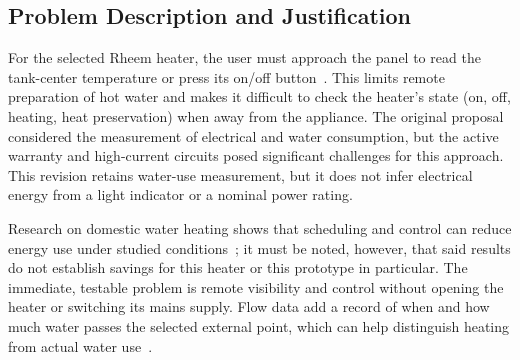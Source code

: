 \subsection{Problem Description and Justification}

For the selected Rheem heater, the user must approach the panel to read the tank-center temperature or press its on/off button~\cite{rheemmanual}. This limits remote preparation of hot water and makes it difficult to check the heater's state (on, off, heating, heat preservation) when away from the appliance. The original proposal considered the measurement of electrical and water consumption, but the active warranty and high-current circuits posed significant challenges for this approach. This revision retains water-use measurement, but it does not infer electrical energy from a light indicator or a nominal power rating.

Research on domestic water heating shows that scheduling and control can reduce energy use under studied conditions~\cite{booysen2019}; it must be noted, however, that said results do not establish savings for this heater or this prototype in particular. The immediate, testable problem is remote visibility and control without opening the heater or switching its mains supply. Flow data add a record of when and how much water passes the selected external point, which can help distinguish heating from actual water use~\cite{lee2021,pirow2018}.